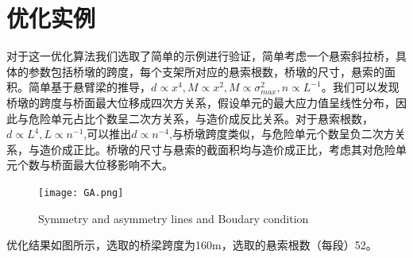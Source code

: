\documentclass[forprint]{WHUBachelor}
\begin{document}
\section{优化实例}
对于这一优化算法我们选取了简单的示例进行验证，简单考虑一个悬索斜拉桥，具体的参数包括桥墩的跨度，每个支架所对应的悬索根数，桥墩的尺寸，悬索的面积。简单基于悬臂梁的推导，$d\propto x^4,M\propto x^2,M\propto \sigma_{max}^2,n \propto L^{-1}$。我们可以发现桥墩的跨度与桥面最大位移成四次方关系，假设单元的最大应力值呈线性分布，因此与危险单元占比个数呈二次方关系，与造价成反比关系。对于悬索根数，$d \propto L^4,L \propto n^{-1}$,可以推出$d \propto n^{-4}$,与桥墩跨度类似，与危险单元个数呈负二次方关系，与造价成正比。桥墩的尺寸与悬索的截面积均与造价成正比，考虑其对危险单元个数与桥面最大位移影响不大。
\begin{figure}[H]
\centering
    \texttt{[image: GA.png]}\hfill
  \caption{Symmetry and asymmetry lines and Boudary condition}
\label{fig:1}
\end{figure}
优化结果如图所示，选取的桥梁跨度为160m，选取的悬索根数（每段）52。

%
%
\cleardoublepage
\end{document}

